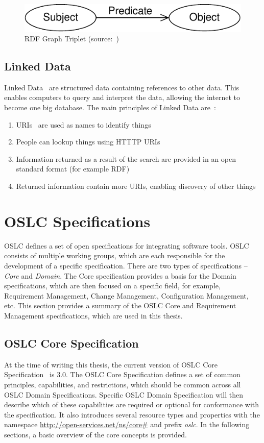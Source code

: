 \begin{figure}[hbt]
  \centering
  \includegraphics[width=.6 \linewidth]{figures/rdf-graph.pdf}
  \caption{RDF Graph Triplet (source: \cite{rdf_primer})}
  \label{fig:rdf_graph_triplet}
\end{figure}

\subsection*{Linked Data}
Linked Data \cite{linked_data} are structured data containing references to other data. This enables computers to query and interpret the data, allowing the internet to become one big database. The main principles of Linked Data are \cite{linked_data_design_issues}:
\begin{enumerate}
  \item URIs \cite{uri_rfc} are used as names to identify things
  \item People can lookup things using HTTTP URIs
  \item Information returned as a result of the search are provided in an open standard format (for example RDF)
  \item Returned information contain more URIs, enabling discovery of other things
\end{enumerate}

\section{OSLC Specifications}
OSLC defines a set of open specifications for integrating software tools. OSLC consists of multiple working groups, which are each responsible for the development of a specific specification. There are two types of specifications -- \emph{Core} and \emph{Domain}. The Core specification provides a basis for the Domain specifications, which are then focused on a specific field, for example, Requirement Management, Change Management, Configuration Management, etc. This section provides a summary of the OSLC Core and Requirement Management specifications, which are used in this thesis.

\subsection{OSLC Core Specification}
\label{sec:oslc_core_specification}
At the time of writing this thesis, the current version of OSLC Core Specification \cite{oslc_core_specification} is 3.0. The OSLC Core Specification defines a set of common principles, capabilities, and restrictions, which should be common across all OSLC Domain Specifications. Specific OSLC Domain Specification will then describe which of these capabilities are required or optional for conformance with the specification. It also introduces several resource types and properties with the namespace \url{http://open-services.net/ns/core\#} and prefix \emph{oslc}. In the following sections, a basic overview of the core concepts is provided.

